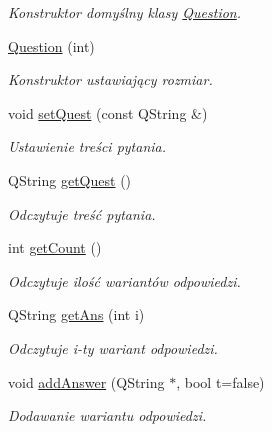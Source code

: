 \begin{DoxyCompactItemize}
\begin{DoxyCompactList}\small\item\em \-Konstruktor domyślny klasy \hyperlink{classQuestion}{\-Question}. \end{DoxyCompactList}\item 
\hyperlink{classQuestion_a3d0520fe99796920613b7c4ecd488c11}{\-Question} (int)
\begin{DoxyCompactList}\small\item\em \-Konstruktor ustawiający rozmiar. \end{DoxyCompactList}\item 
void \hyperlink{classQuestion_acd61e07058f02526ecfbb4b79cbc73df}{set\-Quest} (const \-Q\-String \&)
\begin{DoxyCompactList}\small\item\em \-Ustawienie treści pytania. \end{DoxyCompactList}\item 
\-Q\-String \hyperlink{classQuestion_ab6e80c0dc5bd15bec210d8937e0d9f68}{get\-Quest} ()
\begin{DoxyCompactList}\small\item\em \-Odczytuje treść pytania. \end{DoxyCompactList}\item 
int \hyperlink{classQuestion_a3dea4f0f7cb72d5d0c5fe7223ee947ab}{get\-Count} ()
\begin{DoxyCompactList}\small\item\em \-Odczytuje ilość wariantów odpowiedzi. \end{DoxyCompactList}\item 
\-Q\-String \hyperlink{classQuestion_a2e039ab1e76677f4edbdd9a523de01f4}{get\-Ans} (int i)
\begin{DoxyCompactList}\small\item\em \-Odczytuje i-\/ty wariant odpowiedzi. \end{DoxyCompactList}\item 
void \hyperlink{classQuestion_a09866bbc959b85acaa7e78a1bb2d57b6}{add\-Answer} (\-Q\-String $\ast$, bool t=false)
\begin{DoxyCompactList}\small\item\em \-Dodawanie wariantu odpowiedzi. \end{DoxyCompactList}\end{DoxyCompactItemize}
